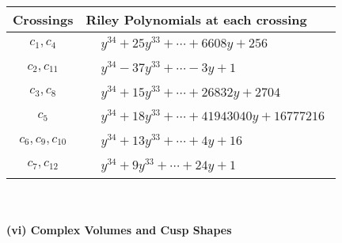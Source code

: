 \documentclass[1p]{elsarticle_modified}
\theoremstyle{definition}
\begin{document}
\begin{tabular}{m{50pt}|m{274pt}}
Crossings & \hspace{64pt}Riley Polynomials at each crossing \\
\hline $$\begin{aligned}c_{1},c_{4}\end{aligned}$$&$\begin{aligned}
&y^{34}+25 y^{33}+\cdots+6608 y+256
\end{aligned}$\\
\hline $$\begin{aligned}c_{2},c_{11}\end{aligned}$$&$\begin{aligned}
&y^{34}-37 y^{33}+\cdots-3 y+1
\end{aligned}$\\
\hline $$\begin{aligned}c_{3},c_{8}\end{aligned}$$&$\begin{aligned}
&y^{34}+15 y^{33}+\cdots+26832 y+2704
\end{aligned}$\\
\hline $$\begin{aligned}c_{5}\end{aligned}$$&$\begin{aligned}
&y^{34}+18 y^{33}+\cdots+41943040 y+16777216
\end{aligned}$\\
\hline $$\begin{aligned}c_{6},c_{9},c_{10}\end{aligned}$$&$\begin{aligned}
&y^{34}+13 y^{33}+\cdots+4 y+16
\end{aligned}$\\
\hline $$\begin{aligned}c_{7},c_{12}\end{aligned}$$&$\begin{aligned}
&y^{34}+9 y^{33}+\cdots+24 y+1
\end{aligned}$\\
\hline
\end{tabular}\\~\\
\newpage\flushleft \textbf{(vi) Complex Volumes and Cusp Shapes}
\end{document}
